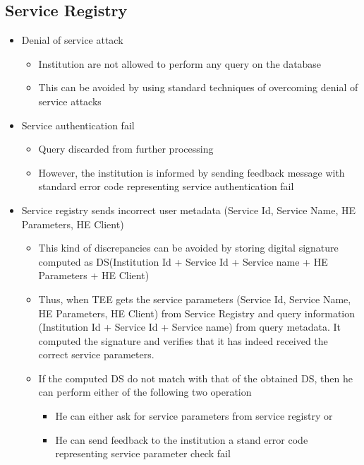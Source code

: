 \subsection{Service Registry}
\begin{itemize}
    \item Denial of service attack
          \begin{itemize}
              \item Institution are not allowed to perform any query on the database
              \item This can be avoided by using standard techniques of overcoming denial of service attacks
          \end{itemize}
    \item Service authentication fail
          \begin{itemize}
              \item Query discarded from further processing
              \item However, the institution is informed by sending feedback message with standard error code representing service authentication fail
          \end{itemize}
    \item Service registry sends incorrect user metadata (Service Id, Service Name, HE Parameters, HE Client)
          \begin{itemize}
              \item This kind of discrepancies can be avoided by storing digital signature computed as DS(Institution Id + Service Id + Service name + HE Parameters + HE Client)
              \item Thus, when TEE gets the service parameters (Service Id, Service Name, HE Parameters, HE Client) from Service Registry and query information (Institution Id + Service Id + Service name) from query metadata. It computed the signature and verifies that it has indeed received the correct service parameters.
              \item If the computed DS do not match with that of the obtained DS, then he can perform either of the following two operation
                    \begin{itemize}
                        \item He can either ask for service parameters from service registry or
                        \item He can send feedback to the institution a stand error code representing service parameter check fail
                    \end{itemize}
          \end{itemize}
\end{itemize}

